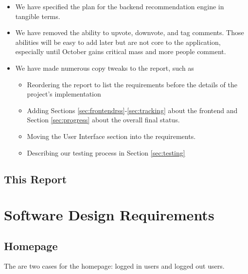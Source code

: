 \documentclass[11pt,letterpaper]{article}
\begin{document}
\begin{itemize}
\item We have specified the plan for the backend recommendation engine in tangible terms.
\item We have removed the ability to upvote, downvote, and tag comments. Those abilities will be easy to add later but are not core to the application, especially until October gains critical mass and more people comment.
\item We have made numerous copy tweaks to the report, such as
  \begin{itemize}
  \item Reordering the report to list the requirements before the details of the project's implementation
  \item Adding Sections \ref{sec:frontendrss}-\ref{sec:tracking} about the frontend and Section \ref{sec:progress} about the overall final status.
  \item Moving the User Interface section into the requirements.
  \item Describing our testing process in Section \ref{sec:testing}
  \end{itemize}
\end{itemize}

\subsection{This Report}

\section{Software Design Requirements}

\subsection{Homepage}
The are two cases for the homepage: logged in users and logged out users.
\end{document}
